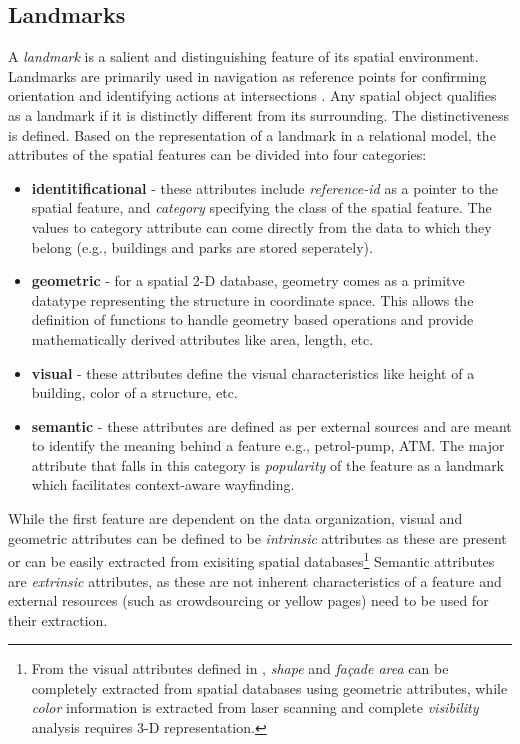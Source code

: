 \documentclass{iitkthesis}
\begin{document}
\subsection{Landmarks}
A \textit{landmark} is a salient and distinguishing feature of its spatial environment. Landmarks are primarily used in navigation as reference points for confirming orientation and identifying actions at intersections \cite{lovelace}. Any spatial object qualifies as a landmark if it is distinctly different from its surrounding.  The distinctiveness is defined. Based on the representation of a landmark in a relational model, the attributes of the spatial features can be divided into four categories:
\begin{itemize}
  \item \textbf{identitificational} - these attributes include \textit{reference-id} as a pointer to the spatial feature, and \textit{category} specifying the class of the spatial feature. The values to category attribute can come directly from the data to which they belong (e.g., buildings and parks are stored seperately).
  \item \textbf{geometric} - for a spatial 2-D database, geometry comes as a primitve datatype representing the structure in coordinate space. This allows the definition of functions to handle geometry based operations and provide mathematically derived attributes like area, length, etc.
  \item \textbf{visual} -  these attributes define the visual characteristics like height of a building, color of a structure, etc.
  \item \textbf{semantic} - these attributes are defined as per external sources and are meant to identify the meaning behind a feature e.g., petrol-pump, ATM.  The major attribute that falls in this category is \textit{popularity} of the feature as a landmark which facilitates context-aware wayfinding.
\end{itemize}

While the first feature are dependent on the data organization, visual and geometric attributes can be defined to be \textit{intrinsic} attributes as these are present or can be easily extracted from exisiting spatial databases\footnote{From the visual attributes defined in \cite{raubal}, \textit{shape} and \textit{fa\c{c}ade area} can be completely extracted from spatial databases using geometric attributes, while \textit{color} information is extracted from laser scanning and complete \textit{visibility} analysis requires 3-D representation.} Semantic attributes are \textit{extrinsic} attributes, as these are not inherent characteristics of a feature and external resources (such as crowdsourcing or yellow pages) need to be used for their extraction.
\end{document}
